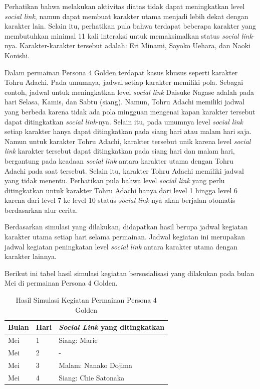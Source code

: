 Perhatikan bahwa melakukan aktivitas diatas tidak dapat meningkatkan level \textit{social link}, namun dapat membuat karakter utama menjadi lebih dekat dengan karakter lain. Selain itu, perhatikan pula bahwa terdapat beberapa karakter yang membutuhkan minimal 11 kali interaksi untuk memaksimalkan status \textit{social link}-nya. Karakter-karakter tersebut adalah: Eri Minami, Sayoko Uehara, dan Naoki Konishi.

Dalam permainan Persona 4 Golden terdapat kasus khusus seperti karakter Tohru Adachi. Pada umumnya, jadwal setiap karakter memiliki pola. Sebagai contoh, jadwal untuk meningkatkan level \textit{social link} Daisuke Nagase adalah pada hari Selasa, Kamis, dan Sabtu (siang). Namun, Tohru Adachi memiliki jadwal yang berbeda karena tidak ada pola mingguan mengenai kapan karakter tersebut dapat ditingkatkan \textit{social link}-nya. Selain itu, pada umumnya level \textit{social link} setiap karakter hanya dapat ditingkatkan pada siang hari atau malam hari saja. Namun untuk karakter Tohru Adachi, karakter tersebut unik karena level \textit{social link} karakter tersebut dapat ditingkatkan pada siang hari dan malam hari, bergantung pada keadaan \textit{social link} antara karakter utama dengan Tohru Adachi pada saat tersebut. Selain itu, karakter Tohru Adachi memiliki jadwal yang tidak menentu. Perhatikan pula bahwa level \textit{social link} yang perlu ditingkatkan untuk karakter Tohru Adachi hanya dari level 1 hingga level 6 karena dari level 7 ke level 10 status \textit{social link}-nya akan berjalan otomatis berdasarkan alur cerita.

Berdasarkan simulasi yang dilakukan, didapatkan hasil berupa jadwal kegiatan karakter utama setiap hari selama permainan. Jadwal kegiatan ini merupakan jadwal kegiatan peningkatan level \textit{social link} antara karakter utama dengan karakter lainnya.

Berikut ini tabel hasil simulasi kegiatan bersosialisasi yang dilakukan pada bulan Mei di permainan Persona 4 Golden.
\begin{table}[H]
    \caption{\label{simres1}Hasil Simulasi Kegiatan Permainan Persona 4 Golden}
    \begin{center}
        \begin{tabular}{ | p{} | p{} | p{} | }
            \hline
            \textbf{Bulan} & \textbf{Hari} & \textbf{\textit{Social Link} yang ditingkatkan} \\
            \hline
            Mei            & 1             & Siang: Marie                                    \\
            \hline
            Mei            & 2             & -                                               \\
            \hline
            Mei            & 3             & Malam: Nanako Dojima                            \\
            \hline
            Mei            & 4             & Siang: Chie Satonaka                            \\
            \hline
        \end{tabular}
    \end{center}
\end{table}



